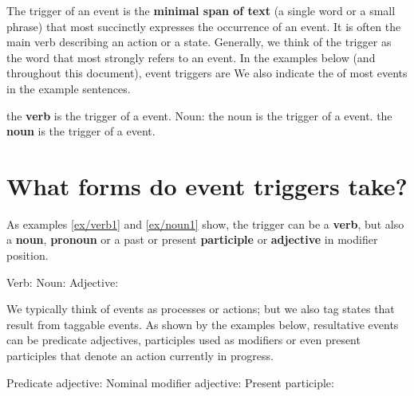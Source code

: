 \documentclass[a4paper]{report}
\begin{document}
The trigger of an event is the \textbf{minimal span of text} (a single word or a small phrase) that most succinctly expresses the occurrence of an event.
It is often the main verb describing an action or a state.
Generally, we think of the trigger as the word that most strongly refers to an event.
In the examples below (and throughout this document), event triggers are 
We also indicate the  of most events in the example sentences.

\begin{exe}
    \ex\label{ex/verb1} 
        \expl the \textbf{verb}  is the trigger of a  event.
    \ex\label{ex/noun1} Noun: 
        \expl the noun  is the trigger of a  event.
    \ex\label{ex/noun2} 
        \expl the \textbf{noun}  is the trigger of a  event.
\end{exe}

\section{What forms do event triggers take?}

As examples \ref{ex/verb1} and \ref{ex/noun1} show, the trigger can be a \textbf{verb}, but also a \textbf{noun}, \textbf{pronoun} or a past or present \textbf{participle} or \textbf{adjective} in modifier position.

\begin{exe}
    \ex\label{ex/verb2} Verb: 
    \ex\label{ex/noun2} Noun: 
    \ex\label{ex/adjective} Adjective: 
\end{exe}

We typically think of events as processes or actions; but we also tag states that result from taggable events.
As shown by the examples below, resultative events can be predicate adjectives, participles used as modifiers or even present participles that denote an action currently in progress.

\begin{exe}
    \ex\label{ex/predicateadjective} Predicate adjective: 
    \ex\label{ex/npadjective} Nominal modifier adjective: 
    \ex\label{ex/presentparticiple} Present participle: 
\end{exe}
\end{document}
